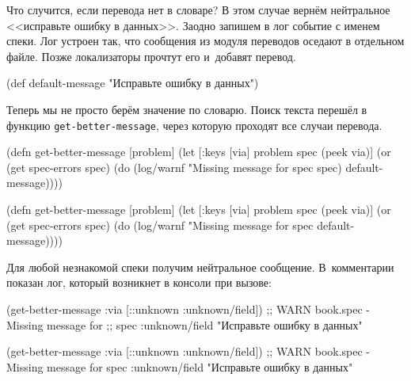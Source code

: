 Что случится, если перевода нет в словаре? В этом случае вернём нейтральное
<<исправьте ошибку в данных>>. Заодно запишем в лог событие с именем спеки. Лог
устроен так, что сообщения из модуля переводов оседают в отдельном файле. Позже
локализаторы прочтут его и~добавят перевод.

\begin{clojure}
(def default-message
  "Исправьте ошибку в данных")
\end{clojure}

\pagebreaklarge

Теперь мы не просто берём значение по словарю. Поиск текста перешёл в функцию
\texttt{get-\-better-\-message}, через которую проходят все случаи перевода.

\ifnarrow

\begin{clojure}
(defn get-better-message [problem]
  (let [{:keys [via]} problem
        spec (peek via)]
    (or (get spec-errors spec)
        (do
          (log/warnf
            "Missing message for spec %
            spec)
          default-message))))
\end{clojure}

\else

\begin{clojure}
(defn get-better-message [problem]
  (let [{:keys [via]} problem
        spec (peek via)]
    (or (get spec-errors spec)
        (do (log/warnf "Missing message for spec %
            default-message))))
\end{clojure}

\fi

Для любой незнакомой спеки получим нейтральное сообщение. В~комментарии показан
лог, который возникнет в консоли при вызове:

\ifnarrow

\begin{clojure}
(get-better-message
    {:via [::unknown :unknown/field]})
;; WARN book.spec - Missing message for
;; spec :unknown/field
"Исправьте ошибку в данных"
\end{clojure}

\else

\begin{clojure}
(get-better-message {:via [::unknown :unknown/field]})
;; WARN book.spec - Missing message for spec :unknown/field
"Исправьте ошибку в данных"
\end{clojure}

\fi

